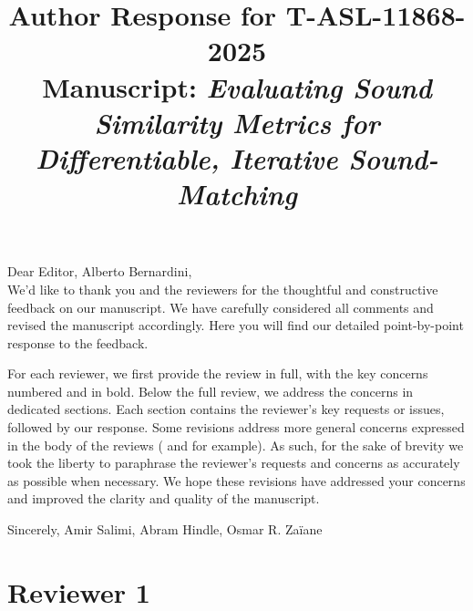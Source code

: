 \documentclass[11pt]{article}
\title{\vspace{-0.5em}Author Response for T-ASL-11868-2025\\
\large Manuscript: \emph{Evaluating Sound Similarity Metrics for Differentiable, Iterative Sound-Matching}}
\author{}
\date{}
\begin{document}
\maketitle
\vspace{-1.25em}

\noindent Dear Editor, Alberto Bernardini, \\
\noindent
We'd like to thank you and the reviewers for the thoughtful and constructive feedback on our manuscript. We have carefully considered all comments and revised the manuscript accordingly. Here you will find our detailed point-by-point response to the feedback. 

For each reviewer, we first provide the review in full, with the key concerns numbered and in bold. Below the full review, we address the concerns in dedicated sections. Each section contains the reviewer's key requests or issues, followed by our response. Some revisions address more general concerns expressed in the body of the reviews ( and  for example). As such, for the sake of brevity we took the liberty to paraphrase the reviewer's requests and concerns as accurately as possible when necessary. We hope these revisions have addressed your concerns and improved the clarity and quality of the manuscript.

\medskip
\noindent Sincerely, Amir Salimi, Abram Hindle, Osmar R. Za{\"i}ane

\section{Reviewer 1}
\end{document}
